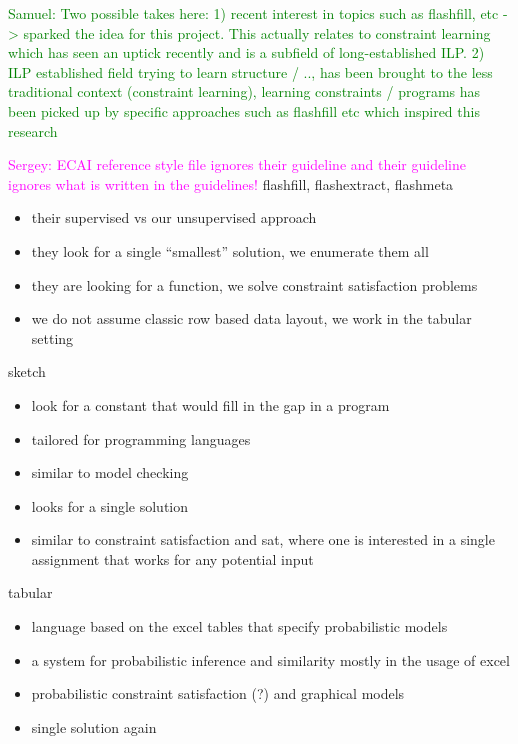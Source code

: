 \documentclass{sig-alternate-05-2015}
\newcommand{\sergey}[1]{\textcolor{magenta}{{\sc Sergey:} #1}\xspace}
\newcommand{\samuel}[1]{\textcolor{green}{{\sc Samuel:} #1}\xspace}
\begin{document}
\samuel{Two possible takes here: 1) recent interest in topics such as flashfill, etc -> sparked the idea for this project. This actually relates to constraint learning which has seen an uptick recently and is a subfield of long-established ILP. 2) ILP established field trying to learn structure / .., has been brought to the less traditional context (constraint learning), learning constraints / programs has been picked up by specific approaches such as flashfill etc which inspired this research}

\sergey{ECAI reference style file ignores their guideline and their guideline ignores what is written in the guidelines!}
flashfill, flashextract, flashmeta \cite{flashfill,flashextract,flashmeta}
\begin{itemize}
  \item their supervised vs our unsupervised approach
  \item they look for a single ``smallest'' solution, we enumerate them all
  \item they are looking for a function, we solve constraint satisfaction problems
  \item we do not assume classic row based data layout, we work in the tabular setting
\end{itemize}

sketch \cite{sketch}
\begin{itemize}
  \item look for a constant that would fill in the gap in a program
  \item tailored for programming languages
  \item similar to model checking
  \item looks for a single solution
  \item similar to constraint satisfaction and sat, where one is interested in a single assignment that works for any potential input
\end{itemize}

tabular \cite{tabular}
\begin{itemize}
  \item language based on the excel tables that specify probabilistic models
  \item a system for probabilistic inference and similarity mostly in the usage of excel
  \item probabilistic constraint satisfaction (?) and graphical models
  \item single solution again
\end{itemize}
\end{document}
